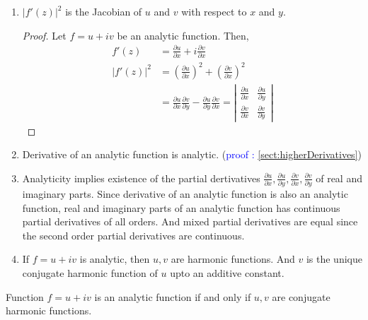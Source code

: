 \begin{enumerate}
	\item $|f'(z)|^2$ is the Jacobian of $u$ and $v$ with respect to $x$ and $y$.
	\begin{proof}
		Let $f = u+iv$ be an analytic function.
		Then,
	\begin{align*}
		f'(z) & = \frac{\partial u}{\partial x} + i \frac{\partial v}{\partial x} \\
		|f'(z)|^2 & = \left(\frac{\partial u}{\partial x} \right)^2 + \left(\frac{\partial v}{\partial x}\right)^2 \\
		& = \frac{\partial u}{\partial x} \frac{\partial v}{\partial y} - \frac{\partial u}{\partial y} \frac{\partial v}{\partial x} = \left|\begin{matrix} \frac{\partial u}{\partial x} & \frac{\partial u}{\partial y} \\ \frac{\partial v}{\partial x} & \frac{\partial v}{\partial y} \end{matrix} \right|
	\end{align*}
	\end{proof}

	\item Derivative of an analytic function is analytic. (\textcolor{blue}{proof : \ref{sect:higherDerivatives}})

	\item Analyticity implies existence of the partial dertivatives $\frac{\partial u}{\partial x}, \frac{\partial u}{\partial y}, \frac{\partial v}{\partial x}, \frac{\partial v}{\partial y}$ of real and imaginary parts.
	Since derivative of an analytic function is also an analytic function, real and imaginary parts of an analytic function has continuous partial derivatives of all orders.
	And mixed partial derivatives are equal since the second order partial derivatives are continuous.

	\item If $f = u +iv$ is analytic, then $u,v$ are harmonic functions.
	And $v$ is the unique conjugate harmonic function of $u$ upto an additive constant.
\end{enumerate}
\begin{theorem}
	Function $f = u+iv$ is an analytic function if and only if $u,v$ are conjugate harmonic functions.
\end{theorem}
